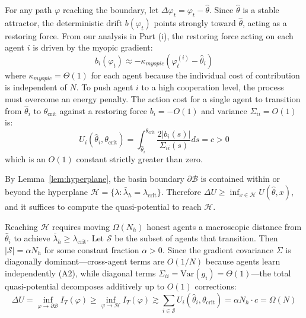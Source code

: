 For any path $\varphi$ reaching the boundary, let $\Delta \varphi_t = \varphi_t - \hat{\theta}$. Since $\hat{\theta}$ is a stable attractor, the deterministic drift $b(\varphi_t)$ points strongly toward $\hat{\theta}$, acting as a restoring force. From our analysis in Part (i), the restoring force acting on each agent $i$ is driven by the myopic gradient:
\begin{equation}
b_i(\varphi_t) \approx - \kappa_{myopic} (\varphi_t^{(i)} - \hat{\theta}_i)
\end{equation}
where $\kappa_{myopic} = \Theta(1)$ for each agent because the individual cost of contribution is independent of $N$.
To push agent $i$ to a high cooperation level, the process must overcome an energy penalty. The action cost for a single agent to transition from $\hat{\theta}_i$ to $\theta_{\mathrm{crit}}$ against a restoring force $b_i = -O(1)$ and variance $\Sigma_{ii} = O(1)$ is:
\begin{equation}
U_i(\hat{\theta}_i, \theta_{\mathrm{crit}}) = \int_{\hat{\theta}_i}^{\theta_{\mathrm{crit}}} \frac{2|b_i(s)|}{\Sigma_{ii}(s)} ds = c > 0
\end{equation}
which is an $O(1)$ constant strictly greater than zero.

By Lemma~\ref{lem:hyperplane}, the basin boundary $\partial \mathcal{B}$ is contained within or beyond the hyperplane $\mathcal{H} = \{\lambda : \bar{\lambda}_h = \lambda_{\mathrm{crit}}\}$. Therefore $\Delta U \geq \inf_{x \in \mathcal{H}} U(\hat{\theta}, x)$, and it suffices to compute the quasi-potential to reach $\mathcal{H}$.

Reaching $\mathcal{H}$ requires moving $\Omega(N_h)$ honest agents a macroscopic distance from $\hat{\theta}_i$ to achieve $\bar{\lambda}_h \geq \lambda_{\mathrm{crit}}$. Let $\mathcal{S}$ be the subset of agents that transition. Then $|\mathcal{S}| = \alpha N_h$ for some constant fraction $\alpha > 0$.
Since the gradient covariance $\Sigma$ is diagonally dominant---cross-agent terms are $O(1/N)$ because agents learn independently (A2), while diagonal terms $\Sigma_{ii} = \mathrm{Var}(g_i) = \Theta(1)$---the total quasi-potential decomposes additively up to $O(1)$ corrections:
\begin{equation}
\Delta U = \inf_{\varphi \to \partial \mathcal{B}} I_T(\varphi) \geq \inf_{\varphi \to \mathcal{H}} I_T(\varphi) \gtrsim \sum_{i \in \mathcal{S}} U_i(\hat{\theta}_i, \theta_{\mathrm{crit}}) = \alpha N_h \cdot c = \Omega(N)
\label{eq:barrier_scaling}
\end{equation}

